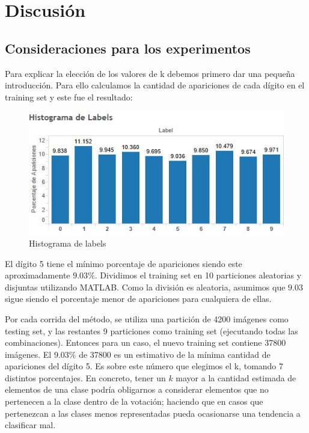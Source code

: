 \documentclass{article}
\begin{document}
\pagebreak

\section*{Discusión}{}

\subsection*{Consideraciones para los experimentos}

Para explicar la elección de los valores de k debemos primero dar una pequeña introducción.  Para ello calculamos la cantidad de apariciones de cada dígito en el training set y este fue el resultado:

\begin{figure}[h]
\centering
\includegraphics[scale=0.80]{histo.jpg}
\caption{Histograma de labels}
\end{figure}

El dígito 5 tiene el mínimo porcentaje de apariciones siendo este aproximadamente $9.03\%$.  Dividimos el training set en 10 particiones aleatorias y disjuntas utilizando MATLAB. Como la división es aleatoria, asumimos que $9.03$ sigue siendo el porcentaje menor de apariciones para cualquiera de ellas. 

Por cada corrida del método, se utiliza una partición de 4200 imágenes como testing set, y las restantes 9 particiones como training set (ejecutando todas las combinaciones).  Entonces para un caso, el nuevo training set contiene 37800 imágenes. El $9.03\%$ de 37800 es un estimativo de la mínima cantidad de apariciones del dígito 5. Es sobre este número que elegimos el k, tomando 7 distintos porcentajes. En concreto, tener un $k$ mayor a la cantidad estimada de elementos de una clase podría obligarnos a considerar elementos que no pertenecen a la clase dentro de la votación; haciendo que en casos que pertenezcan a las clases menos representadas pueda ocasionarse una tendencia a clasificar mal.
\end{document}
